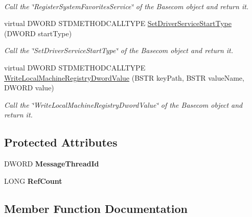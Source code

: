 \begin{DoxyCompactItemize}
$$\begin{DoxyCompactList}\small\item\em Call the \char`\"{}\+Register\+System\+Favorites\+Service\char`\"{} of the Basecom object and return it. \end{DoxyCompactList}\item 
virtual D\+W\+O\+RD S\+T\+D\+M\+E\+T\+H\+O\+D\+C\+A\+L\+L\+T\+Y\+PE \hyperlink{class_gost_crypt_main_com_a565cd48981c15a30f7c52227e414e61d}{Set\+Driver\+Service\+Start\+Type} (D\+W\+O\+RD start\+Type)
\begin{DoxyCompactList}\small\item\em Call the \char`\"{}\+Set\+Driver\+Service\+Start\+Type\char`\"{} of the Basecom object and return it. \end{DoxyCompactList}\item 
virtual D\+W\+O\+RD S\+T\+D\+M\+E\+T\+H\+O\+D\+C\+A\+L\+L\+T\+Y\+PE \hyperlink{class_gost_crypt_main_com_a8dedf36bf770d0929d14bc611743ac07}{Write\+Local\+Machine\+Registry\+Dword\+Value} (B\+S\+TR key\+Path, B\+S\+TR value\+Name, D\+W\+O\+RD value)
\begin{DoxyCompactList}\small\item\em Call the \char`\"{}\+Write\+Local\+Machine\+Registry\+Dword\+Value\char`\"{} of the Basecom object and return it. \end{DoxyCompactList}\end{DoxyCompactItemize}
\subsection*{Protected Attributes}
\begin{DoxyCompactItemize}
\item 
\mbox{\label{class_gost_crypt_main_com_a5a0fa541263d384562046a0c8cfc4a86}} 
D\+W\+O\+RD {\bfseries Message\+Thread\+Id}
\item 
\mbox{\label{class_gost_crypt_main_com_a789a9d9704ba7e9b014d6f99a69a6b2e}} 
L\+O\+NG {\bfseries Ref\+Count}
\end{DoxyCompactItemize}


\subsection{Member Function Documentation}
\mbox{\label{class_gost_crypt_main_com_af8eb4e335bb852b40cb6d24a43fa92f3}} 
